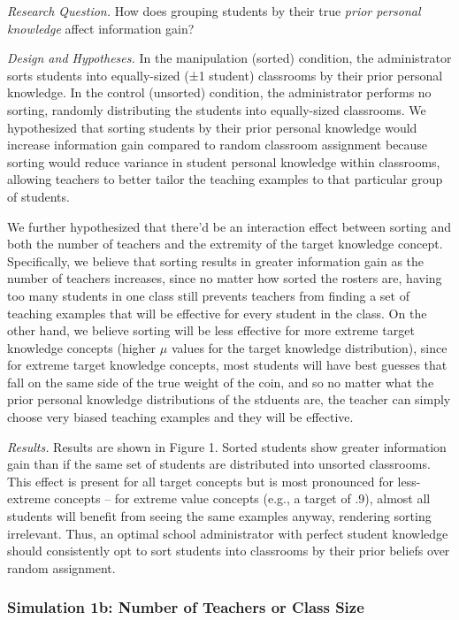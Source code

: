 \documentclass[10pt, letterpaper]{article}
\begin{document}
\emph{Research Question. } How does grouping students by their true
\emph{prior personal knowledge} affect information gain?

\emph{Design and Hypotheses. } In the manipulation (sorted) condition,
the administrator sorts students into equally-sized (±1 student)
classrooms by their prior personal knowledge. In the control (unsorted)
condition, the administrator performs no sorting, randomly distributing
the students into equally-sized classrooms. We hypothesized that sorting
students by their prior personal knowledge would increase information
gain compared to random classroom assignment because sorting would
reduce variance in student personal knowledge within classrooms,
allowing teachers to better tailor the teaching examples to that
particular group of students.

We further hypothesized that there'd be an interaction effect between
sorting and both the number of teachers and the extremity of the target
knowledge concept. Specifically, we believe that sorting results in
greater information gain as the number of teachers increases, since no
matter how sorted the rosters are, having too many students in one class
still prevents teachers from finding a set of teaching examples that
will be effective for every student in the class. On the other hand, we
believe sorting will be less effective for more extreme target knowledge
concepts (higher \(\mu\) values for the target knowledge distribution),
since for extreme target knowledge concepts, most students will have
best guesses that fall on the same side of the true weight of the coin,
and so no matter what the prior personal knowledge distributions of the
stduents are, the teacher can simply choose very biased teaching
examples and they will be effective.

\emph{Results. } Results are shown in Figure 1. Sorted students show
greater information gain than if the same set of students are
distributed into unsorted classrooms. This effect is present for all
target concepts but is most pronounced for less-extreme concepts -- for
extreme value concepts (e.g., a target of .9), almost all students will
benefit from seeing the same examples anyway, rendering sorting
irrelevant. Thus, an optimal school administrator with perfect student
knowledge should consistently opt to sort students into classrooms by
their prior beliefs over random assignment.

\subsubsection{Simulation 1b: Number of Teachers or Class
Size}\label{simulation-1b-number-of-teachers-or-class-size}
\end{document}
